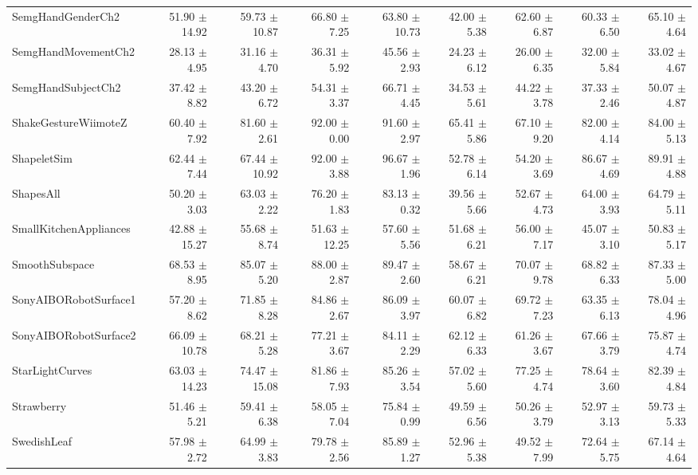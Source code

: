 \begin{landscape}
\begin{longtable}{lrrrrrrrr}
SemgHandGenderCh2 & 51.90 $\pm$ 14.92 & 59.73 $\pm$ 10.87 & 66.80 $\pm$ 7.25 & 63.80 $\pm$ 10.73 & 42.00 $\pm$ 5.38 & 62.60 $\pm$ 6.87 & 60.33 $\pm$ 6.50 & 65.10 $\pm$ 4.64 \\
SemgHandMovementCh2 & 28.13 $\pm$ 4.95 & 31.16 $\pm$ 4.70 & 36.31 $\pm$ 5.92 & 45.56 $\pm$ 2.93 & 24.23 $\pm$ 6.12 & 26.00 $\pm$ 6.35 & 32.00 $\pm$ 5.84 & 33.02 $\pm$ 4.67 \\
SemgHandSubjectCh2 & 37.42 $\pm$ 8.82 & 43.20 $\pm$ 6.72 & 54.31 $\pm$ 3.37 & 66.71 $\pm$ 4.45 & 34.53 $\pm$ 5.61 & 44.22 $\pm$ 3.78 & 37.33 $\pm$ 2.46 & 50.07 $\pm$ 4.87 \\
ShakeGestureWiimoteZ & 60.40 $\pm$ 7.92 & 81.60 $\pm$ 2.61 & 92.00 $\pm$ 0.00 & 91.60 $\pm$ 2.97 & 65.41 $\pm$ 5.86 & 67.10 $\pm$ 9.20 & 82.00 $\pm$ 4.14 & 84.00 $\pm$ 5.13 \\
ShapeletSim & 62.44 $\pm$ 7.44 & 67.44 $\pm$ 10.92 & 92.00 $\pm$ 3.88 & 96.67 $\pm$ 1.96 & 52.78 $\pm$ 6.14 & 54.20 $\pm$ 3.69 & 86.67 $\pm$ 4.69 & 89.91 $\pm$ 4.88 \\
ShapesAll & 50.20 $\pm$ 3.03 & 63.03 $\pm$ 2.22 & 76.20 $\pm$ 1.83 & 83.13 $\pm$ 0.32 & 39.56 $\pm$ 5.66 & 52.67 $\pm$ 4.73 & 64.00 $\pm$ 3.93 & 64.79 $\pm$ 5.11 \\
SmallKitchenAppliances & 42.88 $\pm$ 15.27 & 55.68 $\pm$ 8.74 & 51.63 $\pm$ 12.25 & 57.60 $\pm$ 5.56 & 51.68 $\pm$ 6.21 & 56.00 $\pm$ 7.17 & 45.07 $\pm$ 3.10 & 50.83 $\pm$ 5.17 \\
SmoothSubspace & 68.53 $\pm$ 8.95 & 85.07 $\pm$ 5.20 & 88.00 $\pm$ 2.87 & 89.47 $\pm$ 2.60 & 58.67 $\pm$ 6.21 & 70.07 $\pm$ 9.78 & 68.82 $\pm$ 6.33 & 87.33 $\pm$ 5.00 \\
SonyAIBORobotSurface1 & 57.20 $\pm$ 8.62 & 71.85 $\pm$ 8.28 & 84.86 $\pm$ 2.67 & 86.09 $\pm$ 3.97 & 60.07 $\pm$ 6.82 & 69.72 $\pm$ 7.23 & 63.35 $\pm$ 6.13 & 78.04 $\pm$ 4.96 \\
SonyAIBORobotSurface2 & 66.09 $\pm$ 10.78 & 68.21 $\pm$ 5.28 & 77.21 $\pm$ 3.67 & 84.11 $\pm$ 2.29 & 62.12 $\pm$ 6.33 & 61.26 $\pm$ 3.67 & 67.66 $\pm$ 3.79 & 75.87 $\pm$ 4.74 \\
StarLightCurves & 63.03 $\pm$ 14.23 & 74.47 $\pm$ 15.08 & 81.86 $\pm$ 7.93 & 85.26 $\pm$ 3.54 & 57.02 $\pm$ 5.60 & 77.25 $\pm$ 4.74 & 78.64 $\pm$ 3.60 & 82.39 $\pm$ 4.84 \\
Strawberry & 51.46 $\pm$ 5.21 & 59.41 $\pm$ 6.38 & 58.05 $\pm$ 7.04 & 75.84 $\pm$ 0.99 & 49.59 $\pm$ 6.56 & 50.26 $\pm$ 3.79 & 52.97 $\pm$ 3.13 & 59.73 $\pm$ 5.33 \\
SwedishLeaf & 57.98 $\pm$ 2.72 & 64.99 $\pm$ 3.83 & 79.78 $\pm$ 2.56 & 85.89 $\pm$ 1.27 & 52.96 $\pm$ 5.38 & 49.52 $\pm$ 7.99 & 72.64 $\pm$ 5.75 & 67.14 $\pm$ 4.64 \\

\end{longtable}
\end{landscape}
